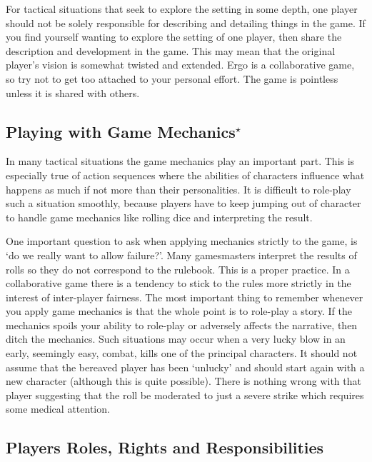 \documentclass[twoside]{book}
\begin{document}
For tactical situations that seek to explore the setting in some
depth, one player should not be solely responsible for describing and
detailing things in the game. If you find yourself wanting to explore
the setting of one player, then share the description and development
in the game. This may mean that the original player's vision is
somewhat twisted and extended. Ergo is a collaborative game, so try
not to get too attached to your personal effort. The game is pointless
unless it is shared with others.

\subsection{Playing with Game Mechanics$^\star$} %

In many tactical situations the game mechanics play an important
part. This is especially true of action sequences where the abilities
of characters influence what happens as much if not more than their
personalities. It is difficult to role-play such a situation smoothly,
because players have to keep jumping out of character to handle game
mechanics like rolling dice and interpreting the result.

One important question to ask when applying mechanics strictly to the
game, is `do we really want to allow failure?'. Many gamesmasters
interpret the results of rolls so they do not correspond to the
rulebook. This is a proper practice. In a collaborative game there is
a tendency to stick to the rules more strictly in the interest of
inter-player fairness. The most important thing to remember whenever
you apply game mechanics is that the whole point is to role-play a
story. If the mechanics spoils your ability to role-play or adversely
affects the narrative, then ditch the mechanics. Such situations may
occur when a very lucky blow in an early, seemingly easy, combat,
kills one of the principal characters. It should not assume that the
bereaved player has been `unlucky' and should start again with a new
character (although this is quite possible). There is nothing wrong
with that player suggesting that the roll be moderated to just a
severe strike which requires some medical attention.

\subsection{Players Roles, Rights and Responsibilities}
\end{document}
